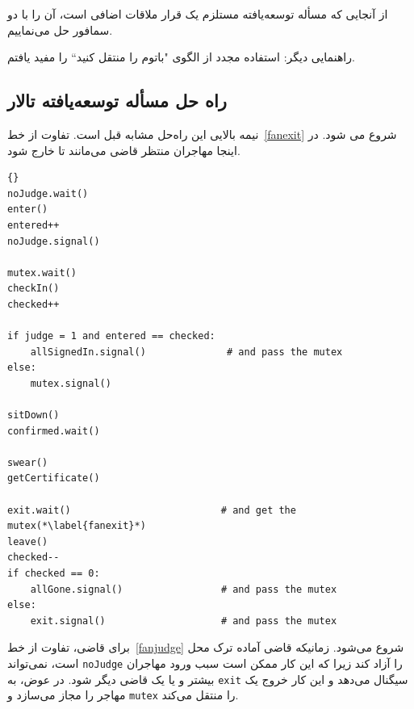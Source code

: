 \documentclass{book}
\newcommand{\clearemptydoublepage}{\newpage\cleardoublepage}
\begin{document}
    از آنجایی که مسأله توسعه‌یافته مستلزم یک قرار ملاقات اضافی است،‌ آن را با دو سمافور حل می‌نماییم. 

    راهنمایی دیگر: استفاده مجدد از الگوی "باتوم را منتقل کنید`` را مفید یافتم.


\clearemptydoublepage
\subsection{راه حل مسأله توسعه‌یافته تالار }

    نیمه بالایی این راه‌حل مشابه قبل است. تفاوت از خط~\ref{fanexit} شروع می شود. در اینجا مهاجران منتظر قاضی می‌مانند تا خارج شود. 

\begin{latin}
\begin{lstlisting}[title=\rl{راهنمایی مسأله تالار \lr{Faneuil} (مهاجر)}]{}
noJudge.wait()
enter()
entered++
noJudge.signal()

mutex.wait()
checkIn()
checked++

if judge = 1 and entered == checked:
    allSignedIn.signal()              # and pass the mutex
else:
    mutex.signal()

sitDown()
confirmed.wait()

swear()
getCertificate()

exit.wait()                          # and get the mutex(*\label{fanexit}*)
leave()
checked--
if checked == 0:
    allGone.signal()                 # and pass the mutex
else:
    exit.signal()                    # and pass the mutex
\end{lstlisting}
\end{latin}

    برای قاضی، تفاوت از خط~\ref{fanjudge} شروع می‌شود. زمانیکه قاضی آماده ترک محل است، نمی‌تواند  {\tt noJudge} را آزاد کند زیرا که 
    این کار ممکن است سبب ورود مهاجران بیشتر و یا یک قاضی دیگر شود.  در عوض،  به {\tt exit} سیگنال می‌دهد و این کار خروج یک مهاجر را 
    مجاز می‌سازد و  {\tt mutex} را منتقل می‌کند. 
    
\end{document}
